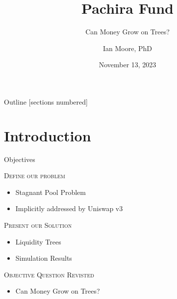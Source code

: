 \documentclass[10pt,xcolor=svgnames]{beamer} %
\title{Pachira Fund}
\author[Name]{Ian Moore, PhD \inst{$\dagger$}}%
\subtitle{Can Money Grow on Trees?}
\institute[shortinst]{\inst{$\dagger$} Tokenomics Researcher / Engineer @ Syslabs (email: imoore@syscoin.org) }
\date{November 13, 2023} %
\begin{document}
{
\maketitle
}%


\begin{frame}{Outline}
  [sections numbered] %
  \tableofcontents[hideallsubsections] %
\end{frame}

\section{Introduction}



\begin{frame}{Objectives}

\begin{exampleblock}{\textsc{Define our problem}}
\begin{itemize}
  \item Stagnant Pool Problem
  \item Implicitly addressed by Uniswap v3
\end{itemize}  
\end{exampleblock}

\begin{exampleblock}{\textsc{Present our Solution}}
\begin{itemize}
  \item Liquidity Trees
  \item Simulation Results
\end{itemize}
\end{exampleblock}

\begin{exampleblock}{\textsc{Objective Question Revisted}}
\begin{itemize}
  \item Can Money Grow on Trees?
\end{itemize}
\end{exampleblock}

\end{frame}
\end{document}
